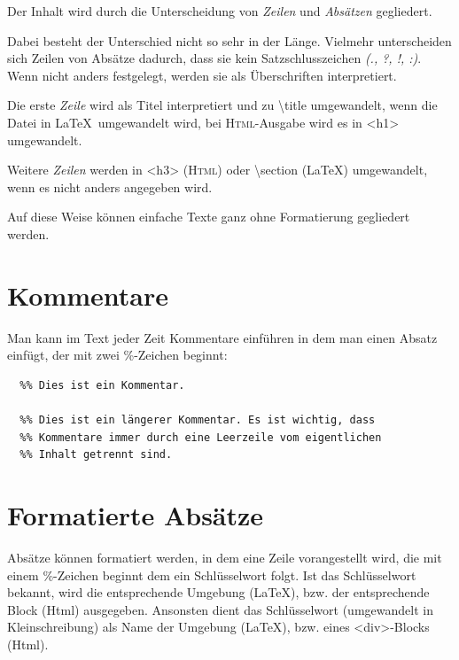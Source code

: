 \documentclass{scrartcl}
\begin{document}
{Der Inhalt wird durch die Unterscheidung von \emph{Zeilen} und
\emph{Absätzen} gegliedert.\\}

{Dabei besteht der Unterschied nicht so sehr in der
Länge. Vielmehr unterscheiden sich Zeilen von Absätze
dadurch, dass sie kein Satzschlusszeichen \emph{(., ?, !, :)}.
Wenn nicht anders festgelegt, werden sie als Überschriften
interpretiert.\\}

{Die erste \emph{Zeile} wird als Titel interpretiert und zu \textbackslash title
umgewandelt, wenn die Datei in \LaTeX\  umgewandelt wird, bei
\textsc{Html}-Ausgabe wird es in <h1> umgewandelt.\\}

{Weitere \emph{Zeilen} werden in <h3> (\textsc{Html}) oder \textbackslash section
(LaTeX) umgewandelt, wenn es nicht anders angegeben wird.\\}

{Auf diese Weise können einfache Texte ganz ohne Formatierung
gegliedert werden.\\}

\section{Kommentare}

{Man kann im Text jeder Zeit Kommentare einführen in dem man einen Absatz einfügt, der mit zwei \%-Zeichen beginnt:\\}

\begin{verbatim}
  %% Dies ist ein Kommentar.

  %% Dies ist ein längerer Kommentar. Es ist wichtig, dass
  %% Kommentare immer durch eine Leerzeile vom eigentlichen
  %% Inhalt getrennt sind.
\end{verbatim}




\section{Formatierte Absätze}

{Absätze können formatiert werden, in dem eine Zeile
vorangestellt wird, die mit einem \%-Zeichen beginnt dem ein
Schlüsselwort folgt. Ist das Schlüsselwort bekannt, wird
die entsprechende Umgebung (LaTeX), bzw. der entsprechende
Block (Html) ausgegeben. Ansonsten dient das Schlüsselwort
(umgewandelt in Kleinschreibung) als Name der Umgebung
(LaTeX), bzw. eines <div>-Blocks (Html).\\}
\end{document}
